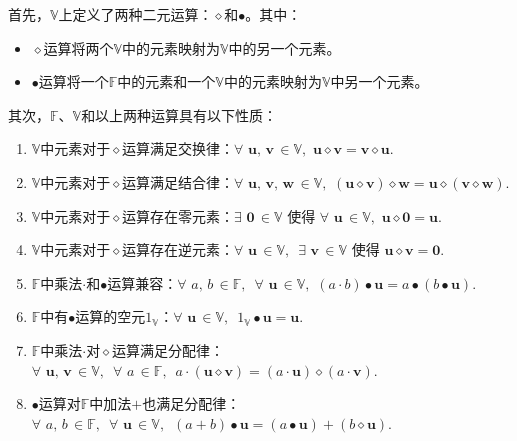 \documentclass[12pt,UTF8,fontset=none]{ctexbook}
\begin{document}
\begin{df}
首先，$\mathbb{V}$上定义了两种二元运算：$\diamond$和$\bullet$。其中：
\begin{itemize}
    \item $\diamond$运算将两个$\mathbb{V}$中的元素映射为$\mathbb{V}$中的另一个元素。
    \item $\bullet$运算将一个$\mathbb{F}$中的元素和一个$\mathbb{V}$中的元素映射为$\mathbb{V}$中另一个元素。
\end{itemize}
其次，$\mathbb{F}$、$\mathbb{V}$和以上两种运算具有以下性质：
\begin{enumerate}
    \item $\mathbb{V}$中元素对于$\diamond$运算满足交换律：$\forall \,\, \mathbf{u}, \, \mathbf{v} \, \in \mathbb{V}, \,\, \mathbf{u} \diamond \mathbf{v} = \mathbf{v} \diamond \mathbf{u}.$
    \item $\mathbb{V}$中元素对于$\diamond$运算满足结合律：$\forall \,\, \mathbf{u}, \, \mathbf{v}, \, \mathbf{w} \, \in \mathbb{V}, \,\, (\mathbf{u} \diamond \mathbf{v}) \diamond \mathbf{w} = \mathbf{u} \diamond (\mathbf{v} \diamond \mathbf{w}).$
    \item $\mathbb{V}$中元素对于$\diamond$运算存在零元素：$\exists \,\, \mathbf{0} \, \in \mathbb{V}$ 使得 $\forall \,\, \mathbf{u} \, \in \mathbb{V}, \,\, \mathbf{u} \diamond \mathbf{0} = \mathbf{u}.$
    \item $\mathbb{V}$中元素对于$\diamond$运算存在逆元素：$\forall \,\, \mathbf{u} \, \in \mathbb{V}, \,\,\, \exists \,\, \mathbf{v} \, \in \mathbb{V}$ 使得 $\mathbf{u} \diamond \mathbf{v} = \mathbf{0}.$
    \item $\mathbb{F}$中乘法$\cdot$和$\bullet$运算兼容：$\forall \,\, a, \, b \, \in \mathbb{F}, \,\,\, \forall \,\, \mathbf{u} \, \in \mathbb{V}, \,\, (a \cdot b)\bullet\mathbf{u} = a \bullet (b\bullet\mathbf{u}).$
    \item $\mathbb{F}$中有$\bullet$运算的空元$1_{\mathbb{V}}$：$\forall \,\, \mathbf{u} \, \in \mathbb{V}, \,\,\, 1_{\mathbb{V}} \bullet \mathbf{u} = \mathbf{u}. $
    \item $\mathbb{F}$中乘法$\cdot$对$\diamond$运算满足分配律：$\forall \,\, \mathbf{u}, \, \mathbf{v} \, \in \mathbb{V}, \,\,\, \forall \,\, a \, \in \mathbb{F}, \,\,\, a\cdot(\mathbf{u} \diamond \mathbf{v}) = (a \cdot \mathbf{u}) \diamond (a \cdot \mathbf{v}). $
    \item $\bullet$运算对$\mathbb{F}$中加法$+$也满足分配律：$\forall \,\, a, \, b \, \in \mathbb{F}, \,\,\, \forall \,\, \mathbf{u} \, \in \mathbb{V}, \,\,\, (a + b)\bullet\mathbf{u} = (a \bullet \mathbf{u}) + (b \diamond \mathbf{u}). $
\end{enumerate}
\end{df}
\end{document}
